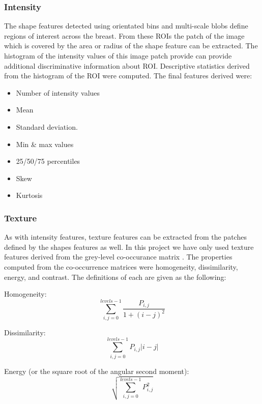 \subsubsection{Intensity}
The shape features detected using orientated bins and multi-scale blobs define regions of interest across the breast. From these ROIs the patch of the image which is covered by the area or radius of the shape feature can be extracted. The histogram of the intensity values of this image patch provide can provide additional discriminative information about ROI. Descriptive statistics derived from the histogram of the ROI were computed. The final features derived were:

\begin{itemize}
	\item Number of intensity values
	\item Mean
	\item Standard deviation.
	\item Min \& max values
	\item 25/50/75 percentiles
	\item Skew
	\item Kurtosis
\end{itemize}

\subsubsection{Texture}
As with intensity features, texture features can be extracted from the patches defined by the shapes features as well. In this project we have only used texture features derived from the grey-level co-occurance matrix \cite{haralick1973textural}. The properties computed from the co-occurrence matrices were homogeneity, dissimilarity, energy, and contrast. The definitions of each are given as the following:

Homogeneity:
\begin{equation}
	\sum\limits_{i,j=0}^{levels-1} \frac{P_{i,j}}{1+(i-j)^2}
\end{equation}

Dissimilarity:
\begin{equation}
	\sum\limits_{i,j=0}^{levels-1} P_{i,j}|i-j|
\end{equation}

Energy (or the square root of the angular second moment):
\begin{equation}
	\sqrt{ \sum\limits_{i,j=0}^{levels-1} P_{i,j}^2 }
\end{equation}

